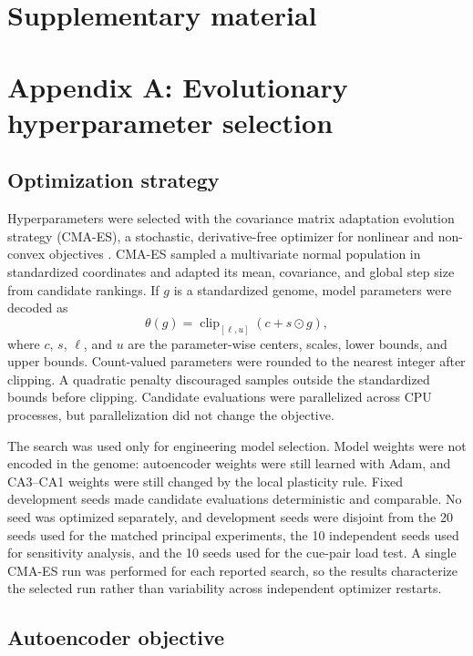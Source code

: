\clearpage
\section*{Supplementary material}

\section*{Appendix A: Evolutionary hyperparameter selection}

\subsection*{Optimization strategy}

Hyperparameters were selected with the covariance matrix adaptation evolution
strategy (CMA-ES), a stochastic, derivative-free optimizer for nonlinear and
non-convex objectives \citep{hansen2016}. CMA-ES sampled a multivariate normal
population in standardized coordinates and adapted its mean, covariance, and
global step size from candidate rankings. If $g$ is a standardized genome,
model parameters were decoded as
\begin{equation}
\theta(g)=\operatorname{clip}_{[\ell,u]}(c+s\odot g),
\label{eq:cma-decoding}
\end{equation}
where $c$, $s$, $\ell$, and $u$ are the parameter-wise centers, scales, lower
bounds, and upper bounds. Count-valued parameters were rounded to the nearest
integer after clipping. A quadratic penalty discouraged samples outside the
standardized bounds before clipping. Candidate evaluations were parallelized
across CPU processes, but parallelization did not change the objective.

The search was used only for engineering model selection. Model weights were
not encoded in the genome: autoencoder weights were still learned with Adam,
and CA3--CA1 weights were still changed by the local plasticity rule. Fixed
development seeds made candidate evaluations deterministic and comparable.
No seed was optimized separately, and development seeds were disjoint from the
20 seeds used for the matched principal experiments, the 10 independent seeds
used for sensitivity analysis, and the 10 seeds used for the cue-pair load
test. A single CMA-ES run was performed for each reported
search, so the results characterize the selected run rather than variability
across independent optimizer restarts.

\subsection*{Autoencoder objective}

